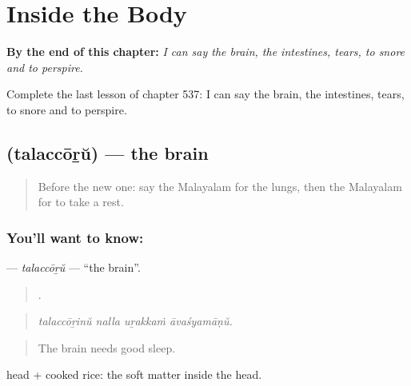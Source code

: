 
\chapter{Inside the Body}
\label{ch:ml-inside-the-body}

\begin{chapteropening}
\textbf{By the end of this chapter:} \emph{I can say the brain, the intestines, tears, to snore and to perspire.}

Complete the last lesson of chapter 537: I can say the brain, the intestines, tears, to snore and to perspire.
\end{chapteropening}

\section[\texorpdfstring{\ml{തലച്ചോറ്} (talaccōṟŭ)}{തലച്ചോറ് (talaccōṟŭ)}]{ (talaccōṟŭ) — the brain}

\label{lesson:ML-C537-talaccoru}



\begin{quote}
Before the new one: say the Malayalam for the lungs, then the Malayalam for to take a rest.
\end{quote}

\subsection*{You'll want to know: }
\textbf{} — \emph{talaccōṟŭ} — \textquotedblleft{}the brain\textquotedblright{}.

\begin{quote}
   .
\end{quote}

\begin{quote}
\emph{talaccōṟinŭ nalla uṟakkaṁ āvaśyamāṇŭ.}
\end{quote}

\begin{quote}
The brain needs good sleep.
\end{quote}

 head +  cooked rice: the soft matter inside the head.

